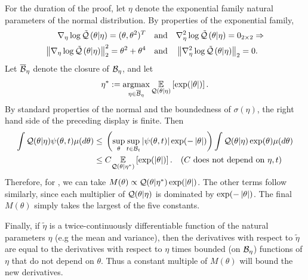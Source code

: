 %
For the duration of the proof, let $\eta$ denote the exponential family natural
parameters of the normal distribution. By properties of the exponential family,
%
\begin{align*}
%
\lqgrad{\theta \vert \eta} ={} (\theta, \theta^2)^T \mathand&
\lqhess{\theta \vert \eta} ={} 0_{2\times2} \Rightarrow\\
%
\norm{\lqgrad{\theta \vert \eta}}_2^2 ={} \theta^2 + \theta^4 \mathand&
\norm{\lqhess{\theta \vert \eta}}_2 ={} 0.
%
\end{align*}
%
Let $\overline{\mathcal{B}}_\eta$ denote the closure of $\mathcal{B}_\eta$, and let
%
\begin{align*}
%
\eta^* := \argmax_{\eta \in \ballclosed_\eta}
    \expect{\q(\theta \vert \eta)}{\exp(\abs{\theta})}.
%
\end{align*}
%
By standard properties of the normal and the boundedness of $\sigma(\eta)$, the
right hand side of the preceding display is finite.
%
Then
%
\begin{align*}
\int \q(\theta \vert \eta) \psi(\theta, \t) \mu(d \theta) \le{}&
    \left( \sup_{\theta} \sup_{\t \in \ball_\t}
        \abs{\psi(\theta, \t)} \exp(-\abs{\theta}) \right)
    \int \q(\theta \vert \eta) \exp(\theta) \mu(d \theta)
%
\\\le{}&
    \const
    \expect{\q(\theta \vert \eta^*)}{\exp(\abs{\theta})}.
    \quad\constdesc{\eta, \t}
%
\end{align*}
%
Therefore, for , we can take $M(\theta)
\propto \mathcal{Q}(\theta \vert \eta^*) \exp(\left|\theta\right|)$. The other terms follow
similarly, since each multiplier of $\mathcal{Q}(\theta \vert \eta)$ is dominated by
$\exp(-\left|\theta\right|)$.  The final $M(\theta)$ simply takes the largest
of the five constants.

Finally, if $\tilde{\eta}$ is a twice-continuously differentiable function of
the natural parameters $\eta$ (e.g the mean and variance), then the derivatives
with respect to $\tilde{\eta}$ are equal to the derivatives with respect to
$\eta$ times bounded (on $\mathcal{B}_\eta$) functions of $\eta$ that do not depend on
$\theta$. Thus a constant multiple of $M(\theta)$ will bound the new
derivatives.
%

\vspace{1em}


